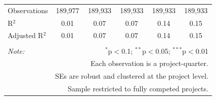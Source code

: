 \documentclass[
]{article}
\begin{document}
\begin{table}[H]
\begin{tabular}{@{\extracolsep{-2pt}}lccccc}
Observations & 189,977 & 189,933 & 189,933 & 189,933 & 189,933 \\ 
R$^{2}$ & 0.01 & 0.07 & 0.07 & 0.14 & 0.15 \\ 
Adjusted R$^{2}$ & 0.01 & 0.07 & 0.07 & 0.14 & 0.15 \\ 
\hline 
\hline \\[-1.8ex] 
\textit{Note:}  & \multicolumn{5}{r}{$^{*}$p$<$0.1; $^{**}$p$<$0.05; $^{***}$p$<$0.01} \\ 
 & \multicolumn{5}{r}{Each observation is a project-quarter.} \\ 
 & \multicolumn{5}{r}{SEs are robust and clustered at the project level.} \\ 
 & \multicolumn{5}{r}{Sample restricted to fully competed projects.} \\ 
\end{tabular} 
\end{table}
\end{document}
